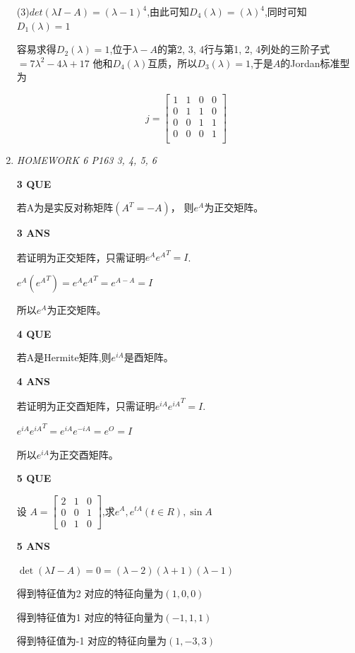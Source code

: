 \documentclass[11pt,letterpaper]{ctexart}
\begin{document}
\begin{enumerate}
(3)$det(\lambda I - A) = (\lambda - 1)^4$,由此可知$D_4(\lambda) = (\lambda)^4$,同时可知 $D_1(\lambda) = 1$

容易求得$D_2(\lambda) = 1$,位于$\lambda - A$的第2, 3, 4行与第1, 2, 4列处的三阶子式 $ = 7 \lambda^2 - 4 \lambda + 17$
他和$D_4(\lambda)$互质，所以$D_3(\lambda) = 1$,于是$A$的Jordan标准型为

\[ j = \begin{bmatrix}
	1 & 1 & 0 & 0 \\
	0 & 1 & 1 & 0 \\
	0 & 0 & 1 & 1 \\
	0 & 0 & 0 & 1 \\
\end{bmatrix}\]


\item \textit{HOMEWORK 6 {P163 3, 4, 5, 6}}%

\textbf{3 QUE}
\bigskip

若A为是实反对称矩阵$(A^T = -A)$， 则$e^A$为正交矩阵。

\textbf{3 ANS}
\bigskip

若证明为正交矩阵，只需证明$e^A {e^A}^T = I$.

$e^A({e^A}^T) = e^A {e^A}^T = e^{A - A} = I$  

所以$e^A$为正交矩阵。

\textbf{4 QUE}
\bigskip

若A是Hermite矩阵,则$e^{iA}$是酉矩阵。

\textbf{4 ANS}
\bigskip

若证明为正交酉矩阵，只需证明$e^{iA} {e^{iA}}^T = I$.

$e^{iA} {e^{iA}}^T = e^{iA} {e^{-iA}} = e^{O} = I$  

所以$e^{iA}$为正交酉矩阵。

\textbf{5 QUE}
\bigskip

设  $A = \begin{bmatrix}
	2 & 1 & 0 \\
	0 & 0 & 1 \\
	0 & 1 & 0
\end{bmatrix}$,求$e^A, e^{tA}(t \in R), \sin A$

\textbf{5 ANS}
\bigskip

$\det(\lambda I - A) =  0 = (\lambda -2)(\lambda + 1)(\lambda - 1)$

得到特征值为2 对应的特征向量为$(1, 0 ,0)$

得到特征值为1 对应的特征向量为$(-1, 1 ,1)$

得到特征值为-1 对应的特征向量为$(1, -3 ,3)$


\end{enumerate}
\end{document}
